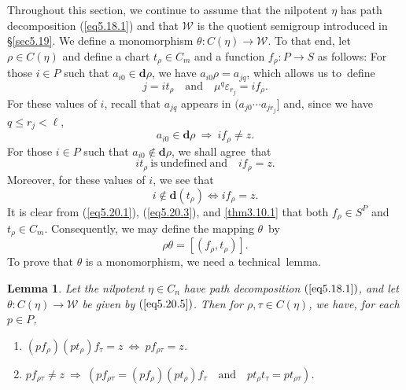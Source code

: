 \documentclass{surv-l}
\numberwithin{equation}{section}
\numberwithin{table}{section}
\numberwithin{figure}{section}
\newtheorem{lemma}[equation]{Lemma}
\theoremstyle{definition}
\begin{document}
Throughout this section, we continue to assume that the nilpotent
$\eta$ has path decomposition (\ref{eq5.18.1}) and that
$\mathcal{W}$ is the quotient semigroup introduced in
\S\ref{sec5.19}. We define a monomorphism $\theta :
C(\eta)\rightarrow \mathcal{W}$. To that end, let $\rho\in
C(\eta)$ and define a chart $t_{\rho}\in C_{m}$ and a function
$f_{\rho} : P\rightarrow S$ as follows: For those $i\in P$ such
that $ a_{i0}\in \mathbf{d}\rho$, we have $a_{i0}\rho=a_{jq}$,
which allows us to~define
\begin{equation}\label{eq5.20.1}
 j=it_{\rho}\quad \mathrm{and}\quad \mu^{q}\varepsilon_{r_{j}}=if_{\rho}.
\end{equation}
For these values of $i$, recall that $a_{jq}$ appears in
$(a_{j0}\cdots a_{jr_{j}}]$ and, since we have $q\leq r_{j}<\ell$,
\begin{equation}\label{eq5.20.2}
a_{i0}\in \mathbf{d}\rho\ \Rightarrow\ if_{\rho}\neq z.
\end{equation}
For those $i\in P$ such that $a_{i0}\not\in \mathbf{d}\rho$, we
shall agree~that
\begin{equation}\label{eq5.20.3}
it_{\rho}\ \mathrm{is\ undefined\ and}\quad if_{\rho}=z.
\end{equation}
Moreover, for these values of $i$, we see that
\begin{equation}\label{eq5.20.4}
 i\not\in \mathbf{d}(t_{\rho})\Leftrightarrow if_{\rho}=z.
\end{equation}
It is clear from (\ref{eq5.20.1}), (\ref{eq5.20.3}), and
\ref{thm3.10.1} that both $f_{\rho}\in S^{P}$ and $t_{\rho}\in
C_{m}$. Consequently, we may define the mapping $\theta$~by
\begin{equation}\label{eq5.20.5}
\rho\theta=[(f_{\rho}, t_{\rho})].
\end{equation}
To prove that $\theta$ is a monomorphism, we need a
technical~lemma.

\begin{lemma}\label{lem5.20.6}
Let the nilpotent $\eta\in C_{n}$ have path decomposition
$(\ref{eq5.18.1})$, and let $\theta : C(\eta)\rightarrow
\mathcal{W}$ be given by $(\ref{eq5.20.5})$. Then for $\rho,
\tau\in C(\eta)$, we have, for each $p\in P$,
\begin{enumerate}
\item[($i$)] $(pf_{\rho})(pt_{\rho})f_{\tau}=z\ \Leftrightarrow\
pf_{\rho\tau}=z$.

\item[($ii$)] $pf_{\rho\tau}\neq z\ \Rightarrow\
(pf_{\rho\tau}=(pf_{\rho})(pt_{\rho})f_{\tau}\quad \text{and}\quad
pt_{\rho}t_{\tau}=pt_{\rho\tau})$.
\end{enumerate}
\end{lemma}
\end{document}
